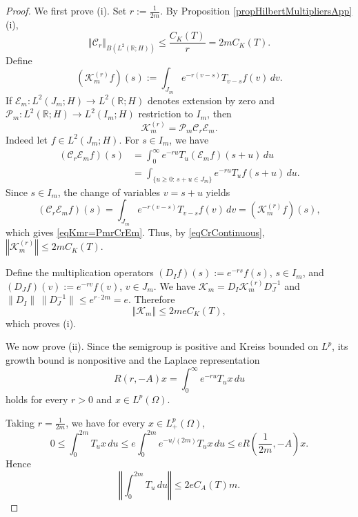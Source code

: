 \documentclass[12pt]{amsart}
\theoremstyle{plain}
\theoremstyle{remark}
\theoremstyle{definition}
\newcommand{\R}{\mathbb{R}}
\newcommand{\norm}[1]{\left\Vert #1\right\Vert}
\begin{document}
	\begin{proof}
		We first prove (i). Set $r :=\frac{1}{2m}$. By Proposition \ref{propHilbertMultipliersApp}(i),
		\begin{equation}\label{eqCrContinuous}
			\norm{\mathcal C_r}_{B(L^2(\R;H))} \le \frac{C_K(T)}{r}=2mC_K(T).
		\end{equation}
		Define
		\[
		(\mathcal K_m^{(r)}f)(s) := \int_{J_m} e^{-r(v-s)} T_{v-s}f(v)\,dv.
		\]
		If $\mathcal{E}_m:L^2(J_m;H)\to L^2(\mathbb R;H)$ denotes extension by zero and $\mathcal{P}_m:L^2(\mathbb R;H)\to L^2(I_m;H)$ restriction to $I_m$, then
		\begin{equation}\label{eqKmr=PmrCrEm}
			\mathcal K_m^{(r)} = \mathcal{P}_m\mathcal C_r \mathcal{E}_m.
		\end{equation}
		Indeed let $f\in L^2(J_m;H)$. For $s\in I_m$, we have
		\begin{align*}
			(\mathcal C_r\mathcal{E}_mf)(s)
			&= \int_0^\infty e^{-ru}T_u(\mathcal{E}_mf)(s+u)\,du\\
			&= \int_{\{u\ge0:\,s+u\in J_m\}} e^{-ru}T_u f(s+u)\,du.
		\end{align*}
		Since $s\in I_m$, the change of variables $v=s+u$ yields
		\[
		(\mathcal C_r\mathcal{E}_mf)(s) = \int_{J_m} e^{-r(v-s)}T_{v-s}f(v)\,dv = (\mathcal K_m^{(r)}f)(s),
		\]
		which gives \eqref{eqKmr=PmrCrEm}. Thus, by \eqref{eqCrContinuous}, $\norm{\mathcal K_m^{(r)}} \le 2mC_K(T)$.
		
		Define the multiplication operators $(D_I f)(s):=e^{-r s}f(s)$, $s\in I_m$, and $(D_J f)(v):=e^{-r v}f(v)$, $v\in J_m$. We have $\mathcal K_m = D_I\mathcal K_m^{(r)}D_J^{-1}$ and $\|D_I\|\,\|D_J^{-1}\| \le e^{r \cdot 2m}=e.$ Therefore
		\[
		\norm{\mathcal K_m} \le 2meC_K(T),
		\]
		which proves (i).
		\medskip
		
		We now prove (ii). Since the semigroup is positive and Kreiss bounded on $L^p$, its growth bound is nonpositive and the Laplace representation
		\begin{equation*}\label{eqLaplacepositive}
			R(r,-A)x
			=
			\int_0^\infty e^{-ru}T_ux\,du
		\end{equation*}
		holds for every $r>0$ and $x\in L^p(\Omega)$.
		
		Taking $r=\frac{1}{2m}$, we have for every $x\in L^p_+(\Omega)$,
		\[
		0
		\le
		\int_0^{2m}T_ux\,du
		\le
		e\int_0^{2m}e^{-u/(2m)}T_ux\,du
		\le
		eR\left(\frac{1}{2m},-A\right)x.
		\]
		Hence
		\begin{equation*}\label{eqCesaroPositiveContinuous}
			\norm{\int_0^{2m}T_u\,du}
			\le
			2eC_A(T)m.
		\end{equation*}
		

\end{proof}
\end{document}
